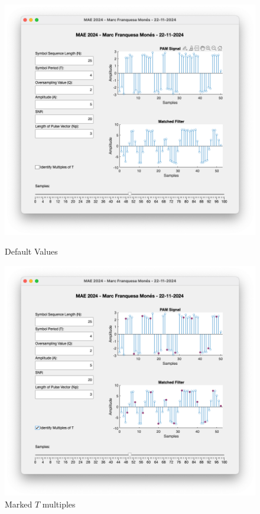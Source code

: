 \begin{figure}[H]
\centering
\begin{minipage}{.5\textwidth}
\centering
\includegraphics[width=\linewidth]{figures/1.png}
\caption{Default Values}
\label{fig:figures/1.png}
\end{minipage}%
\begin{minipage}{.5\textwidth}
\centering
\includegraphics[width=\linewidth]{figures/2.png}
\caption{Marked $ T $ multiples}
\label{fig:figures/2.png}
\end{minipage}
\end{figure}

